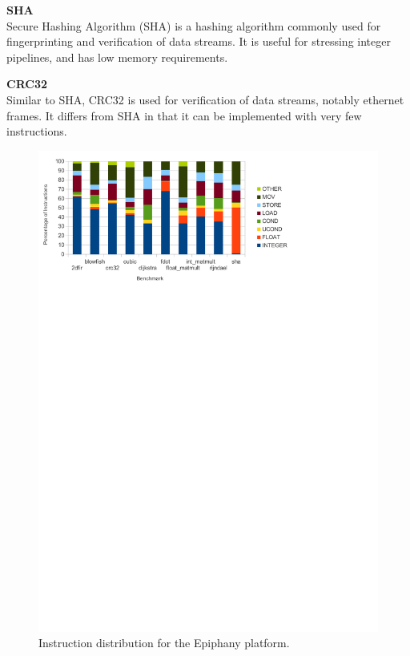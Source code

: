 \documentclass[twocolumn]{article}
\begin{document}
\vspace{3mm}
\textbf{SHA}\\
Secure Hashing Algorithm (SHA) is a hashing algorithm commonly used for fingerprinting and verification of data streams. It is useful for stressing integer pipelines, and has low memory requirements.

\vspace{3mm}
\textbf{CRC32}\\
Similar to SHA, CRC32 is used for verification of data streams, notably ethernet frames. It differs from SHA in that it can be implemented with very few instructions.

\begin{figure}[t]
	\includegraphics[width=\linewidth,clip, trim=0 8.5in 2in 0]{epiphany.pdf}
	\caption{Instruction distribution for the Epiphany platform.}
	\label{Fig:InstructionDistributionEpiphany}
\end{figure}
\end{document}
